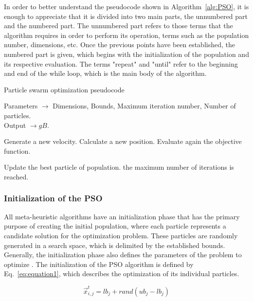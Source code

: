 In order to better understand the pseudocode shown in Algorithm~\ref{alg:PSO}, it is enough to appreciate that it is divided into two main parts, the unnumbered part and the numbered part. The unnumbered part refers to those terms that the algorithm requires in order to perform its operation, terms such as the population number, dimensions, etc. Once the previous points have been established, the numbered part is given, which begins with the initialization of the population and its respective evaluation. The terms "repeat" and "until" refer to the beginning and end of the while loop, which is the main body of the algorithm.

\begin{algorithm}[h!]
\caption{Particle swarm optimization pseudocode}
Parameters $\rightarrow$ Dimensions, Bounds, Maximum iteration number, Number of particles.\\
Output $\rightarrow gB$.   
\begin{algorithmic}[1]
\REPEAT
{}

\STATE Generate a new velocity.
\STATE Calculate a new position.
\STATE Evaluate again the objective function.
\ENDFOR
		
\STATE Update the best particle of population.
\UNTIL the maximum number of iterations is reached.
\end{algorithmic}
\label{alg:PSO}
\end{algorithm}

\subsubsection{Initialization of the PSO}

All meta-heuristic algorithms have an initialization phase that has the primary purpose of creating the initial population, where each particle represents a candidate solution for the optimization problem. These particles are randomly generated in a search space, which is delimited by the established bounds. Generally, the initialization phase also defines the parameters of the problem to optimize \cite{erick2021matlab}. The initialization of the PSO algorithm is defined by Eq.~\ref{eq:equation1}, which describes the optimization of its individual particles.

\begin{equation}
\vec{x}_{i,j}^t=lb_j+rand(ub_j-lb_j)
\label{eq:equation1}
\end{equation}

